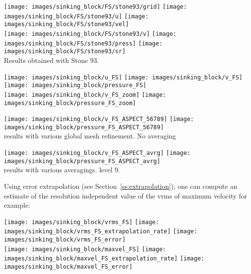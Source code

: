 \begin{center}
\texttt{[image: images/sinking\_block/FS/stone93/grid]}
\texttt{[image: images/sinking\_block/FS/stone93/u]}
\texttt{[image: images/sinking\_block/FS/stone93/vel]}\\
\texttt{[image: images/sinking\_block/FS/stone93/v]}
\texttt{[image: images/sinking\_block/FS/stone93/press]}
\texttt{[image: images/sinking\_block/FS/stone93/sr]}\\
{\captionfont Results obtained with Stone 93.}
\end{center}

\begin{center}
\texttt{[image: images/sinking\_block/u\_FS]}
\texttt{[image: images/sinking\_block/v\_FS]}
\texttt{[image: images/sinking\_block/pressure\_FS]}\\
\texttt{[image: images/sinking\_block/v\_FS\_zoom]}
\texttt{[image: images/sinking\_block/pressure\_FS\_zoom]}\\
\end{center}


\begin{center}
\texttt{[image: images/sinking\_block/v\_FS\_ASPECT\_56789]}
\texttt{[image: images/sinking\_block/pressure\_FS\_ASPECT\_56789]}\\
{\captionfont \aspect{} results with various global mesh refinement. No averaging}
\end{center}

\begin{center}
\texttt{[image: images/sinking\_block/v\_FS\_ASPECT\_avrg]}
\texttt{[image: images/sinking\_block/pressure\_FS\_ASPECT\_avrg]}\\
{\captionfont \aspect{} results with various averagings. level 9.}
\end{center}


Using error extrapolation (see Section~\ref{ss:extrapolation}), one can compute an 
estimate of the resolution independent value of the vrms of maximum velocity for example:

\begin{center}
\texttt{[image: images/sinking\_block/vrms\_FS]}
\texttt{[image: images/sinking\_block/vrms\_FS\_extrapolation\_rate]}
\texttt{[image: images/sinking\_block/vrms\_FS\_error]}\\
\texttt{[image: images/sinking\_block/maxvel\_FS]}
\texttt{[image: images/sinking\_block/maxvel\_FS\_extrapolation\_rate]}
\texttt{[image: images/sinking\_block/maxvel\_FS\_error]}
\end{center}

